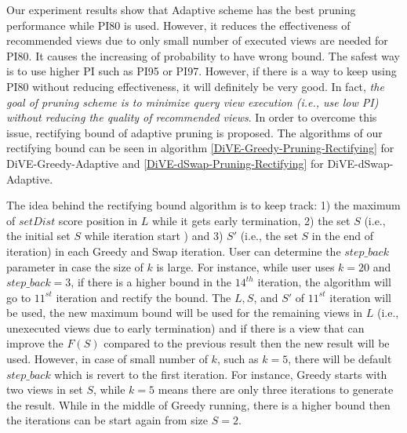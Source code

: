\documentclass{article}
\begin{document}
%
%		



Our experiment results show that Adaptive scheme has the best pruning performance while PI80 is used. However, it reduces the effectiveness of recommended views due to only small number of executed views are needed for PI80. It causes the increasing of probability to have wrong bound. The safest way is to use higher PI such as PI95 or PI97. However, if there is a way to keep using PI80 without reducing effectiveness, it will definitely be very good. In fact, \textit{the goal of pruning scheme is to minimize query view execution (i.e., use low PI) without reducing the quality of recommended views}. In order to overcome this issue, rectifying bound of adaptive pruning is proposed. The algorithms of our rectifying bound can be seen in algorithm \ref{DiVE-Greedy-Pruning-Rectifying} for DiVE-Greedy-Adaptive and \ref{DiVE-dSwap-Pruning-Rectifying} for DiVE-dSwap-Adaptive. 

The idea behind the rectifying bound algorithm is to keep track: 1) the maximum of $setDist$ score position in $L$ while it gets early termination, 2) the set $S$ (i.e., the initial set $S$ while iteration start ) and 3) $S'$ (i.e., the set $S$ in the end of iteration) in each Greedy and Swap iteration. User can determine the $step\_back$ parameter in case the size of $k$ is large. For instance, while user uses $k = 20$ and $step\_back = 3$, if there is a higher bound in the $14^{th}$ iteration, the algorithm will go to $11^{st}$ iteration and rectify the bound. The $L, S $, and $S'$ of $11^{st}$ iteration will be used, the new maximum bound will be used for the remaining views in $L$ (i.e., unexecuted views due to early termination) and if there is a view that can improve the $F(S)$ compared to the previous result then the new result will be used. However, in case of small number of $k$, such as $k = 5$, there will be default $step\_back$ which is revert to the first iteration. For instance, Greedy starts with two views in set $S$, while $k = 5$ means there are only three iterations to generate the result. While in the middle of Greedy running, there is a higher bound then the iterations can be start again from size $S = 2$.    
\end{document}
